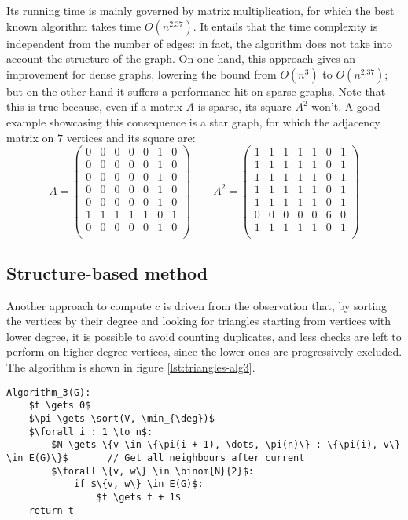 Its running time is mainly governed by matrix multiplication, for which the best known algorithm takes time $O(n^{2.37})$. It entails that the time complexity is independent from the number of edges: in fact, the algorithm does not take into account the structure of the graph. On one hand, this approach gives an improvement for dense graphs, lowering the bound from $O(n^3)$ to $O(n^{2.37})$; but on the other hand it suffers a performance hit on sparse graphs. Note that this is true because, even if a matrix $A$ is sparse, its square $A^2$ won't. A good example showcasing this consequence is a star graph, for which the adjacency matrix on $7$ vertices and its square are:
\[
	A = \begin{pmatrix}
		0 & 0 & 0 & 0 & 0 & 1 & 0 \\
		0 & 0 & 0 & 0 & 0 & 1 & 0 \\
		0 & 0 & 0 & 0 & 0 & 1 & 0 \\
		0 & 0 & 0 & 0 & 0 & 1 & 0 \\
		0 & 0 & 0 & 0 & 0 & 1 & 0 \\
		1 & 1 & 1 & 1 & 1 & 0 & 1 \\
		0 & 0 & 0 & 0 & 0 & 1 & 0 \\
    \end{pmatrix}
    \qquad
	A^2 = \begin{pmatrix}
		1 & 1 & 1 & 1 & 1 & 0 & 1 \\
		1 & 1 & 1 & 1 & 1 & 0 & 1 \\
		1 & 1 & 1 & 1 & 1 & 0 & 1 \\
		1 & 1 & 1 & 1 & 1 & 0 & 1 \\
		1 & 1 & 1 & 1 & 1 & 0 & 1 \\
		0 & 0 & 0 & 0 & 0 & 6 & 0 \\
		1 & 1 & 1 & 1 & 1 & 0 & 1 \\
	\end{pmatrix}
\]


\subsection{Structure-based method}

Another approach to compute $c$ is driven from the observation that, by sorting the vertices by their degree and looking for triangles starting from vertices with lower degree, it is possible to avoid counting duplicates, and less checks are left to perform on higher degree vertices, since the lower ones are progressively excluded. The algorithm is shown in figure \ref{lst:triangles-alg3}.
\begin{lstlisting}[caption = {Algorithm 3}, label = {lst:triangles-alg3}]
Algorithm_3(G):
    $t \gets 0$
    $\pi \gets \sort(V, \min_{\deg})$
    $\forall i : 1 \to n$:
        $N \gets \{v \in \{\pi(i + 1), \dots, \pi(n)\} : \{\pi(i), v\} \in E(G)\}$       // Get all neighbours after current
        $\forall \{v, w\} \in \binom{N}{2}$:
            if $\{v, w\} \in E(G)$:
                $t \gets t + 1$
    return t
\end{lstlisting}

